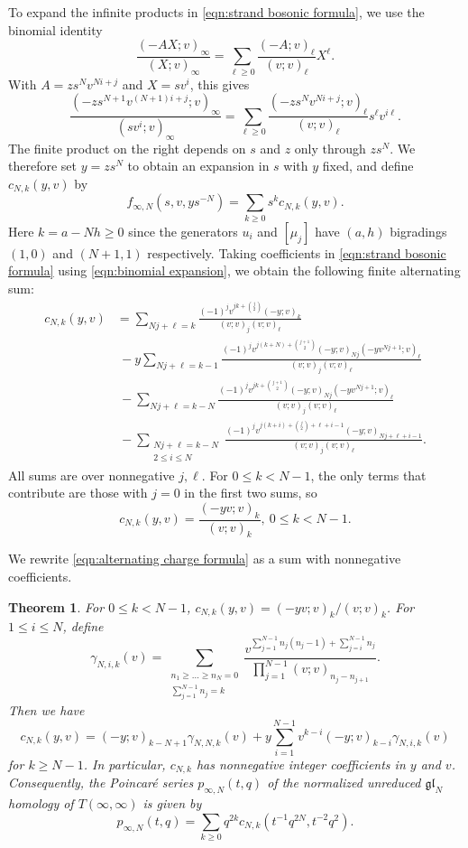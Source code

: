 \documentclass[reqno]{amsart}
\newtheorem{thm}{Theorem}[section]
\theoremstyle{definition}
\theoremstyle{remark}
\newcommand{\gl}{\mathfrak{gl}}
\begin{document}
To expand the infinite products in \eqref{eqn:strand bosonic formula}, we use the binomial identity
\[\frac{(-AX;v)_\infty}{(X;v)_\infty}=\sum_{\ell\ge0}\frac{(-A;v)_\ell}{(v;v)_\ell}X^\ell.\]With $A=zs^Nv^{Ni+j}$ and $X=sv^i$, this gives
\begin{equation}\label{eqn:binomial expansion}
\frac{(-zs^{N+1}v^{(N+1)i+j};v)_\infty}{(sv^i;v)_\infty}=\sum_{\ell\ge0}\frac{(-zs^Nv^{Ni+j};v)_\ell}{(v;v)_\ell}s^\ell v^{i\ell}.
\end{equation}
The finite product on the right depends on $s$ and $z$ only through $zs^N$. We therefore set $y=zs^N$ to obtain an expansion in $s$ with $y$ fixed, and define $c_{N,k}(y,v)$ by
\begin{equation}\label{eqn:charge series}
f_{\infty,N}(s,v,ys^{-N})=\sum_{k\ge0}s^kc_{N,k}(y,v).
\end{equation}
Here $k=a-Nh\ge 0$ since the generators $u_i$ and $[\mu_j]$ have $(a,h)$ bigradings $(1,0)$ and $(N+1,1)$ respectively. Taking coefficients in \eqref{eqn:strand bosonic formula} using \eqref{eqn:binomial expansion}, we obtain the following finite alternating sum:
\begin{equation}\label{eqn:alternating charge formula}
\begin{aligned}
c_{N,k}(y,v)&=\sum_{Nj+\ell=k}\frac{(-1)^jv^{jk+\binom{j}{2}}(-y;v)_k}{(v;v)_j(v;v)_\ell}\\
&\ -y\sum_{Nj+\ell=k-1}\frac{(-1)^jv^{j(k+N)+\binom{j+1}{2}}(-y;v)_{Nj}(-yv^{Nj+1};v)_\ell}{(v;v)_j(v;v)_\ell}\\
&\ -\sum_{Nj+\ell=k-N}\frac{(-1)^jv^{jk+\binom{j+1}{2}}(-y;v)_{Nj}(-yv^{Nj+1};v)_\ell}{(v;v)_j(v;v)_\ell}\\
&\ -\sum_{\substack{Nj+\ell=k-N\\2\le i\le N}}\frac{(-1)^jv^{j(k+i)+\binom{j}{2}+\ell+i-1}(-y;v)_{Nj+\ell+i-1}}{(v;v)_j(v;v)_\ell}.
\end{aligned}
\end{equation}
All sums are over nonnegative $j,\ell$. For $0\le k<N-1$, the only terms that contribute are those with $j=0$ in the first two sums, so
\[c_{N,k}(y,v)=\frac{(-yv;v)_k}{(v;v)_k},\ 0\le k<N-1.\]

We rewrite \eqref{eqn:alternating charge formula} as a sum with nonnegative coefficients.

\begin{thm}\label{thm:fermionic formula}
For $0\le k<N-1$, $c_{N,k}(y,v)=(-yv;v)_k/(v;v)_k$. For $1\le i\le N$, define
\[\gamma_{N,i,k}(v)=\sum_{\substack{n_1\ge\dots\ge n_N=0\\\sum_{j=1}^{N-1}n_j=k}}\frac{v^{\sum_{j=1}^{N-1}n_j(n_j-1)+\sum_{j=i}^{N-1}n_j}}{\prod_{j=1}^{N-1}(v;v)_{n_j-n_{j+1}}}.\]
Then we have
\begin{equation}\label{eqn:fermionic formula}
c_{N,k}(y,v)=(-y;v)_{k-N+1}\gamma_{N,N,k}(v)+y\sum_{i=1}^{N-1}v^{k-i}(-y;v)_{k-i}\gamma_{N,i,k}(v)
\end{equation}for $k\ge N-1$.
In particular, $c_{N,k}$ has nonnegative integer coefficients in $y$ and $v$. Consequently, the Poincar\'e series $p_{\infty,N}(t,q)$ of the normalized unreduced $\gl_N$ homology of $T(\infty,\infty)$ is given by
\[p_{\infty,N}(t,q)=\sum_{k\ge0}q^{2k}c_{N,k}(t^{-1}q^{2N},t^{-2}q^2).\]
\end{thm}
\end{document}
